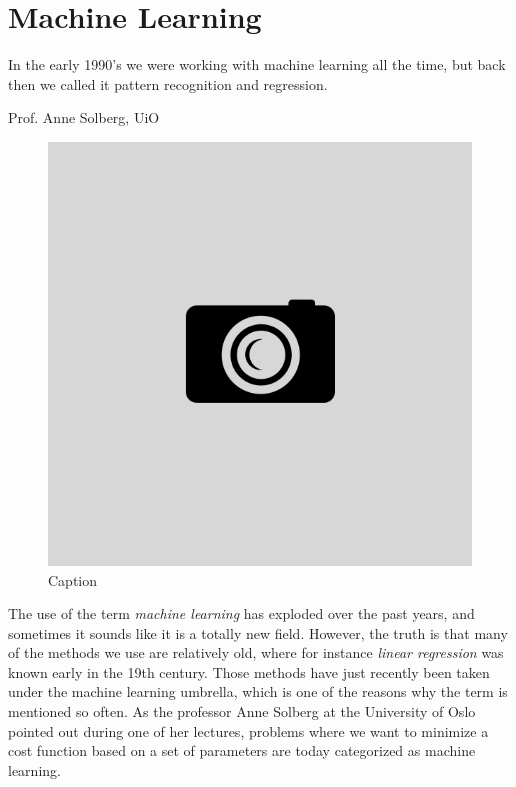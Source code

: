 \chapter{Machine Learning} \label{chp:machinelearning}
\epigraph{In the early 1990's we were working with machine learning all the time, but back then we called it pattern recognition and regression.}{Prof. Anne Solberg, UiO}
\begin{figure}[H]
	\centering
	\includegraphics[scale=0.4]{Images/example.png}
	\caption{Caption}
\end{figure}

The use of the term \textit{machine learning} has exploded over the past years, and sometimes it sounds like it is a totally new field. However, the truth is that many of the methods we use are relatively old, where for instance \textit{linear regression} was known early in the 19th century. \cite{legendre_nouvelles_1805}\cite{gauss_theoria_1809} Those methods have just recently been taken under the machine learning umbrella, which is one of the reasons why the term is mentioned so often. As the professor Anne Solberg at the University of Oslo pointed out during one of her lectures, problems where we want to minimize a cost function based on a set of parameters are today categorized as machine learning.

